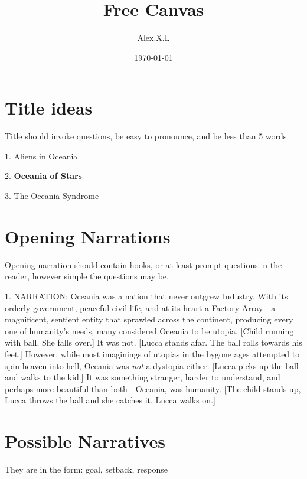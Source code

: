 \documentclass[11pt]{article}
\begin{document}
\begin{titlepage}
\title{Free Canvas}
\author{Alex.X.L}
\date{\today} %
\maketitle
\thispagestyle{empty} %
\end{titlepage}



\tableofcontents
\newpage %






\section{Title ideas}
Title should invoke questions, be easy to pronounce, and be less than 5 words. 

1. Aliens in Oceania

2. \textbf{Oceania of Stars}

3. The Oceania Syndrome

\section{Opening Narrations}
Opening narration should contain hooks, or at least prompt questions in the reader, however simple the questions may be.

1. NARRATION: Oceania was a nation that never outgrew Industry. With its orderly government, peaceful civil life, and at its heart a Factory Array - a magnificent, sentient entity that sprawled across the continent, producing every one of humanity's needs, many considered Oceania to be utopia. [Child running with ball. She falls over.] It was not. [Lucca stands afar. The ball rolls towards his feet.] However, while most imaginings of utopias in the bygone ages attempted to spin heaven into hell, Oceania was \textit{not} a dystopia either. [Lucca picks up the ball and walks to the kid.] It was something stranger, harder to understand, and perhaps more beautiful than both - Oceania, was humanity. [The child stands up, Lucca throws the ball and she catches it. Lucca walks on.]


\section{Possible Narratives}
They are in the form: goal, setback, response
\end{document}
